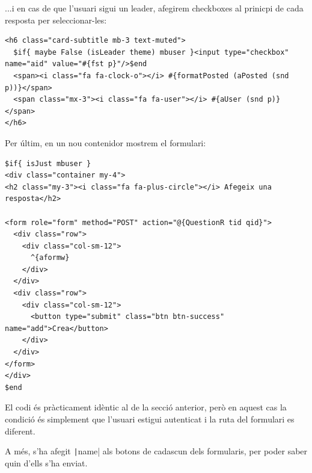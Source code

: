 \documentclass[catalan, a4paper]{scrartcl}
\begin{document}
...i en cas de que l'usuari sigui un leader, afegirem checkboxes al
prinicpi de cada resposta per seleccionar-les:

\begin{verbatim}
<h6 class="card-subtitle mb-3 text-muted">
  $if{ maybe False (isLeader theme) mbuser }<input type="checkbox" name="aid" value="#{fst p}"/>$end
  <span><i class="fa fa-clock-o"></i> #{formatPosted (aPosted (snd p))}</span>
  <span class="mx-3"><i class="fa fa-user"></i> #{aUser (snd p)}</span>
</h6>
\end{verbatim}

Per últim, en un nou contenidor mostrem el formulari:

\begin{verbatim}
$if{ isJust mbuser }
<div class="container my-4">
<h2 class="my-3"><i class="fa fa-plus-circle"></i> Afegeix una resposta</h2>

<form role="form" method="POST" action="@{QuestionR tid qid}">
  <div class="row">
    <div class="col-sm-12">
      ^{aformw}
    </div>
  </div>
  <div class="row">
    <div class="col-sm-12">
      <button type="submit" class="btn btn-success" name="add">Crea</button>
    </div>
  </div>
</form>
</div>
$end
\end{verbatim}

El codi és pràcticament idèntic al de la secció anterior, però en aquest
cas la condició és simplement que l'usuari estigui autenticat i la ruta
del formulari es diferent.

A més,
s'ha afegit \texttt|name| als botons de cadascun dels formularis,
per poder saber quin d'ells s'ha enviat.
\end{document}
